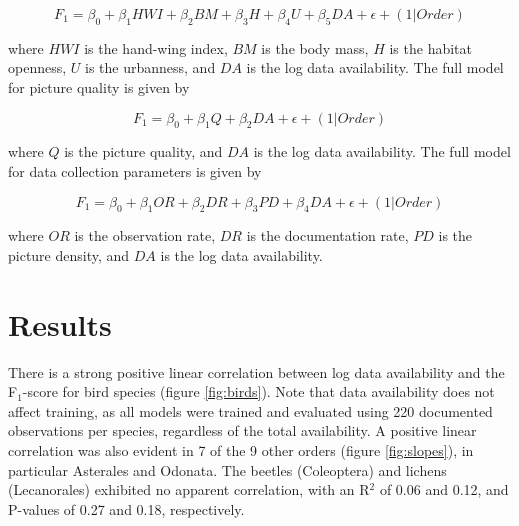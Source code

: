 \documentclass{article}
\begin{document}
\[ F_1 = \beta_0 + \beta_1HWI + \beta_2BM + \beta_3H + \beta_4U + \beta_5DA + \epsilon + (1|Order) \]

where \(HWI\) is the hand-wing index, \(BM\) is the body mass, \(H\) is the habitat openness, \(U\) is the urbanness, and \(DA\) is the log data availability. The full model for picture quality is given by


\[ F_1 = \beta_0 + \beta_1Q + \beta_2DA + \epsilon + (1|Order) \]

where \(Q\) is the picture quality, and \(DA\) is the log data availability. The full model for data collection parameters is given by

\[ F_1 = \beta_0 + \beta_1OR + \beta_2DR + \beta_3PD + \beta_4DA + \epsilon + (1|Order) \]

where \(OR\) is the observation rate, \(DR\) is the documentation rate, \(PD\) is the picture density, and \(DA\) is the log data availability.




\section*{Results}
There is a strong positive linear correlation between log data availability and the F$_1$-score for bird species (figure \ref{fig:birds}). Note that data availability does not affect training, as all models were trained and evaluated using 220 documented observations per species, regardless of the total availability. A positive linear correlation was also evident in 7 of the 9 other orders (figure \ref{fig:slopes}), in particular Asterales and Odonata. The beetles (Coleoptera) and lichens (Lecanorales) exhibited no apparent correlation, with an R\(^2\) of 0.06 and 0.12, and P-values of 0.27 and 0.18, respectively.
\end{document}
